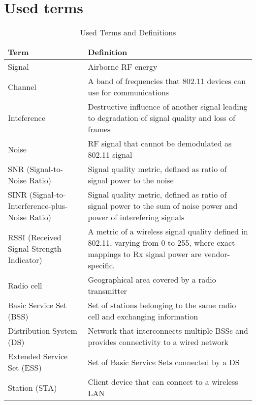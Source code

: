 \appendix
\makeatletter
\let\@currsize\normalsize
\makeatother
\chapter{Used terms}

\begin{longtable}{|p{6cm}|p{10cm}|}
\caption{Used Terms and Definitions}
\label{appx:table:defs_table} \\
    \hline
    \textbf{Term} & \textbf{Definition} \\ \hline
    Signal & Airborne RF energy \cite{colemanCWNACertifiedWireless2021} \\
    \hline
    Channel & A band of frequencies that 802.11 devices can use for communications \cite{AuthoritativeDictionaryIEEE2000} \\
    \hline
    Inteference & Destructive influence of another signal leading to degradation of signal quality and loss of frames \\
    \hline
    Noise & RF signal that cannot be demodulated as 802.11 signal \\
    \hline
    SNR (Signal-to-Noise Ratio) & Signal quality metric, defined as ratio of signal power to the noise \\
    \hline
    SINR (Signal-to-Interference-plus-Noise Ratio) & Signal quality metric, defined as ratio of signal power to the sum of noise power and power of interefering signals \\
    \hline
    RSSI (Received Signal Strength Indicator) & A metric of a wireless signal quality defined in 802.11, varying from 0 to 255, where exact mappings to Rx signal power are vendor-specific. \\
    \hline
    Radio cell & Geographical area covered by a radio transmitter \cite{tanenbaumComputerNetworks2020} \\
    \hline
    Basic Service Set (BSS) & Set of stations belonging to the same radio cell and exchanging information \cite{konsgenSpectrumManagementAlgorithms2010} \\
    \hline
    Distribution System (DS) & Network that interconnects multiple BSSs and provides connectivity to a wired network \cite{konsgenSpectrumManagementAlgorithms2010} \\
    \hline
    Extended Service Set (ESS) & Set of Basic Service Sets connected by a DS \cite{konsgenSpectrumManagementAlgorithms2010} \\
    \hline
    Station (STA) & Client device that can connect to a wireless LAN \\

\end{longtable}
